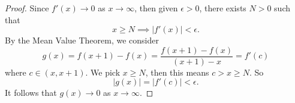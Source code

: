 \begin{Exercise}
	\begin{proof}
		Since $f'(x)\to 0$ as $x\to\infty$, then given $\epsilon>0$, there exists $N>0$ such that
		$$
		x\geq N \implies |f'(x)| < \epsilon.
		$$
		By the Mean Value Theorem, we consider
		$$
		g(x) = f(x+1)-f(x)
		= \frac{f(x+1)-f(x)}{(x+1)-x}
		= f'(c)
		$$
		where $c\in(x,x+1)$. 
		We pick $x \geq N$, then this means $c>x\geq N$. So
		$$
		|g(x)| = |f'(c)| < \epsilon.
		$$
		It follows that $g(x)\to 0$ as $x\to\infty$.
	\end{proof}
\end{Exercise}